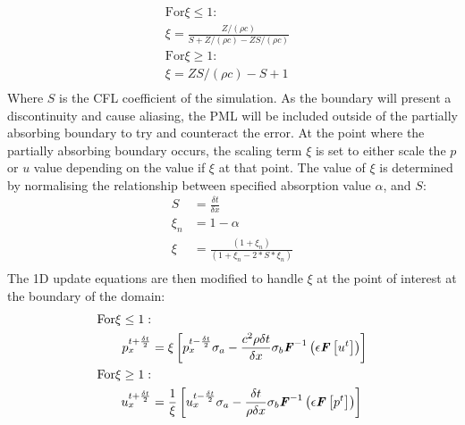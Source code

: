 \begin{equation}
\begin{aligned}
\textrm{For} \xi \leq 1: & \\
\xi = \frac{Z / (\rho c)}{S + Z / (\rho c) - Z S / (\rho c)}\\
\textrm{For} \xi \geq 1: & \\
\xi = Z S / (\rho c) - S + 1\\
\end{aligned}
\end{equation}
Where $S$ is the CFL coefficient of the simulation. As the boundary will present a discontinuity and cause aliasing, the PML will be included outside of the partially absorbing boundary to try and counteract the error. At the point where the partially absorbing boundary occurs, the scaling term $\xi$ is set to either scale the $p$ or $u$ value depending on the value if $\xi$ at that point. The value of $\xi$ is determined by normalising the relationship between specified absorption value $\alpha$, and $S$:\\
\begin{equation}
\begin{aligned}
S & = \frac{\delta t}{\delta x} \\
\xi_n & = 1 - \alpha \\
\xi & = \frac{(1 + \xi_n)}{(1 + \xi_n - 2 * S * \xi_n)}\\
\end{aligned}
\end{equation}
The 1D update equations are then modified to handle $\xi$ at the point of interest at the boundary of the domain:\\
\begin{equation}
\begin{aligned}
\textrm{For} \xi \leq 1: & \\
p^{t + \frac{\delta t}{2}}_{x} &= \xi \left[ p^{t - \frac{\delta t}{2}}_{x} \sigma_a - \frac{c^2 \rho \delta t}{\delta x} \sigma_b \textbf{\textit{F}}^{-1}\left( \epsilon \textbf{\textit{F}} \left[ u^{t} \right] \right) \right] \\
\textrm{For} \xi \geq 1: & \\
u^{t + \frac{\delta t}{2}}_{x} &= \frac{1}{\xi} \left[ u^{t - \frac{\delta t}{2}}_{x} \sigma_a - \frac{\delta t}{\rho \delta x} \sigma_b \textbf{\textit{F}}^{-1}\left(\epsilon \textbf{\textit{F}}\left[p^{t}\right] \right) \right] \\
\end{aligned}
\end{equation}


